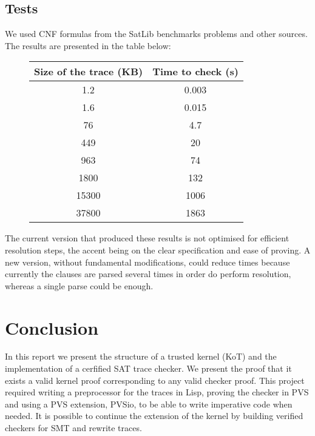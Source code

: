 \documentclass[a4paper,12pt]{article}
\begin{document}
\subsection{Tests}
We used CNF formulas from the SatLib benchmarks problems and other sources. The results are presented in the table below: 
\begin{figure}

\begin{tabular}{|c|c|}
\hline
 Size of the trace (KB) & Time to check (s) \\
\hline
1.2 & 0.003  \\
1.6 & 0.015  \\
76 & 4.7 \\
449 & 20 \\
963 & 74 \\ 
1800 & 132 \\
15300 & 1006\\
37800 & 1863 \\
\hline
\end{tabular} 

\end{figure}


The current version that produced these results is not optimised for efficient resolution steps, the accent being on the clear 
specification and ease of proving. A new version, without fundamental modifications, could reduce times because currently
the clauses are parsed several times in order do perform resolution, whereas a single parse could be enough.

\section{Conclusion}
In this report we present the structure of a trusted kernel (KoT) and the implementation of a cerfified SAT trace checker. We present
the proof that it exists a valid kernel proof corresponding to any valid checker proof. This project required writing a preprocessor for the traces
in Lisp, proving the checker in PVS and using a PVS extension, PVSio, to be able to write imperative code when needed. 
It is possible to continue the extension of the kernel by building verified checkers for SMT and rewrite traces. 



\end{document}
